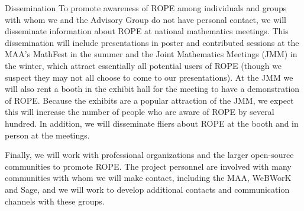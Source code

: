 \documentclass[11pt]{article}
\begin{document}
\begin{section}{Dissemination}
To promote awareness of ROPE among individuals and groups with whom we
and the Advisory Group do not have personal contact, we will disseminate
information about ROPE at national mathematics meetings.  This
dissemination will include presentations in poster and contributed
sessions at the MAA's MathFest in the summer and the Joint Mathematics
Meetings (JMM) in the winter, which attract essentially all potential
users of ROPE (though we suspect they may not all choose to come to our
presentations).  At the JMM we will also rent a booth in the exhibit hall
for the meeting to have a demonstration of ROPE.  Because the exhibits
are a popular attraction of the JMM, we expect this will increase the
number of people who are aware of ROPE by several hundred.  In
addition, we will disseminate fliers about ROPE at the booth and in
person at the meetings.

Finally, we will work with professional organizations and the larger
open-source communities to promote ROPE.  The project personnel are
involved with many communities with whom we will make contact, including
the MAA, WeBWorK and Sage, and we will work to develop additional contacts
and communication channels with these groups.

\end{section}
\end{document}
